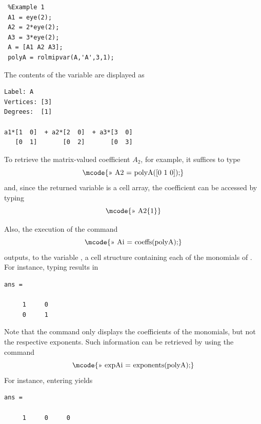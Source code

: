 \documentclass[english,11pt]{article}
\newcommand\vi{\vspace{.5cm}}
\theoremstyle{break} \theorembodyfont{\small\rm}
\begin{document}
\begin{minipage}{8.5cm}
\begin{lstlisting}
 %Example 1
 A1 = eye(2);
 A2 = 2*eye(2);
 A3 = 3*eye(2);
 A = [A1 A2 A3];
 polyA = rolmipvar(A,'A',3,1);
\end{lstlisting}
\end{minipage}

\vi
The contents of the  variable  are displayed as

\begin{minipage}{8.5cm}
\begin{lstlisting}[rulecolor=\color{red}]
Label: A
Vertices: [3]
Degrees:  [1]

a1*[1  0]  + a2*[2  0]  + a3*[3  0]
   [0  1]       [0  2]       [0  3]
\end{lstlisting}
\end{minipage}
\vi

To retrieve the matrix-valued coefficient $A_2$, for example, it suffices to type
\[
\mbox{\mcode{>> A2 = polyA([0 1 0]);}}
\]
and, since the returned variable is a cell array, the coefficient can be accessed by typing
\[
\mbox{\mcode{>> A2\{1\}}}
\]

Also, the execution of the command
\[
\mbox{\mcode{>> Ai = coeffs(polyA);}}
\]
outputs, to the variable , a cell structure containing each of the monomials of . For instance,
typing  results in

\begin{minipage}{3.5cm}
\begin{lstlisting}[rulecolor=\color{red}]
ans =

     1     0
     0     1
\end{lstlisting}
\end{minipage}

Note that the command  only displays the coefficients of the monomials, but not the respective exponents.
Such information can be retrieved by using the command
\[
\mbox{\mcode{>> expAi = exponents(polyA);}}
\]
For instance, entering  yields

\begin{minipage}{5.5cm}
\begin{lstlisting}[rulecolor=\color{red}]
ans =

     1     0     0
\end{lstlisting}
\end{minipage}
\end{document}
